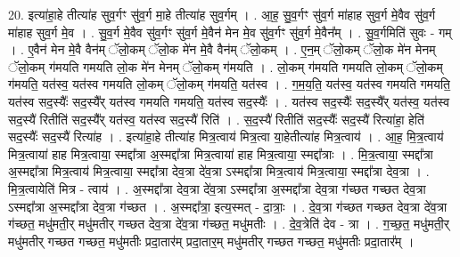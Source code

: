 \documentclass[17pt]{extarticle}
\begin{document}
20. इत्या॑हा॒हे तीत्या॑ह सुव॒र्गꣳ सु॑व॒र्ग मा॒हे तीत्या॑ह सुव॒र्गम् । . आ॒ह॒ सु॒व॒र्गꣳ सु॑व॒र्ग मा॑हाह सुव॒र्ग मे॒वैव सु॑व॒र्ग मा॑हाह सुव॒र्ग मे॒व । . सु॒व॒र्ग मे॒वैव सु॑व॒र्गꣳ सु॑व॒र्ग मे॒वैन॑ मेन मे॒व सु॑व॒र्गꣳ सु॑व॒र्ग मे॒वैन᳚म् । . सु॒व॒र्गमिति॑ सुवः - गम् । . ए॒वैन॑ मेन मे॒वै वैन॑म् ॅलो॒कम् ॅलो॒क मे॑न मे॒वै वैन॑म् ॅलो॒कम् । . ए॒न॒म् ॅलो॒कम् ॅलो॒क मे॑न मेनम् ॅलो॒कम् ग॑मयति गमयति लो॒क मे॑न मेनम् ॅलो॒कम् ग॑मयति । . लो॒कम् ग॑मयति गमयति लो॒कम् ॅलो॒कम् ग॑मयति॒ यत॑स्व॒ यत॑स्व गमयति लो॒कम् ॅलो॒कम् ग॑मयति॒ यत॑स्व । . ग॒म॒य॒ति॒ यत॑स्व॒ यत॑स्व गमयति गमयति॒ यत॑स्व सद॒स्यैः᳚ सद॒स्यै᳚र् यत॑स्व गमयति गमयति॒ यत॑स्व सद॒स्यैः᳚ । . यत॑स्व सद॒स्यैः᳚ सद॒स्यै᳚र् यत॑स्व॒ यत॑स्व सद॒स्यै॑ रितीति॑ सद॒स्यै᳚र् यत॑स्व॒ यत॑स्व सद॒स्यै॑ रिति॑ । . स॒द॒स्यै॑ रितीति॑ सद॒स्यैः᳚ सद॒स्यै॑ रित्या॑हा॒ हेति॑ सद॒स्यैः᳚ सद॒स्यै॑ रित्या॑ह । . इत्या॑हा॒हे तीत्या॑ह मित्र॒त्वाय॑ मित्र॒त्वा या॒हेतीत्या॑ह मित्र॒त्वाय॑ । . आ॒ह॒ मि॒त्र॒त्वाय॑ मित्र॒त्वाया॑ हाह मित्र॒त्वाया॒ स्मद्दा᳚त्रा अ॒स्मद्दा᳚त्रा मित्र॒त्वाया॑ हाह मित्र॒त्वाया॒ स्मद्दा᳚त्राः । . मि॒त्र॒त्वाया॒ स्मद्दा᳚त्रा अ॒स्मद्दा᳚त्रा मित्र॒त्वाय॑ मित्र॒त्वाया॒ स्मद्दा᳚त्रा देव॒त्रा दे॑व॒त्रा ऽस्मद्दा᳚त्रा मित्र॒त्वाय॑ मित्र॒त्वाया॒ स्मद्दा᳚त्रा देव॒त्रा । . मि॒त्र॒त्वायेति॑ मित्र - त्वाय॑ । . अ॒स्मद्दा᳚त्रा देव॒त्रा दे॑व॒त्रा ऽस्मद्दा᳚त्रा अ॒स्मद्दा᳚त्रा देव॒त्रा ग॑च्छत गच्छत देव॒त्रा ऽस्मद्दा᳚त्रा अ॒स्मद्दा᳚त्रा देव॒त्रा ग॑च्छत । . अ॒स्मद्दा᳚त्रा॒ इत्य॒स्मत् - दा॒त्राः॒ । . दे॒व॒त्रा ग॑च्छत गच्छत देव॒त्रा दे॑व॒त्रा ग॑च्छत॒ मधु॑मती॒र् मधु॑मतीर् गच्छत देव॒त्रा दे॑व॒त्रा ग॑च्छत॒ मधु॑मतीः । . दे॒व॒त्रेति॑ देव - त्रा । . ग॒च्छ॒त॒ मधु॑मती॒र् मधु॑मतीर् गच्छत गच्छत॒ मधु॑मतीः प्रदा॒तार॑म् प्रदा॒तार॒म् मधु॑मतीर् गच्छत गच्छत॒ मधु॑मतीः प्रदा॒तार᳚म् । \newline
\end{document}
